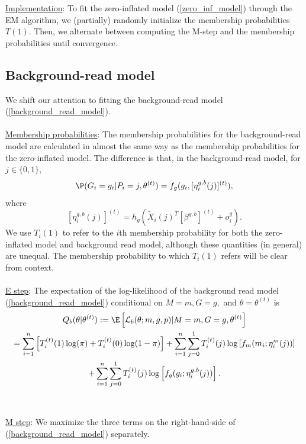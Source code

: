 \documentclass[12pt]{article}
\begin{document}
\underline{Implementation}: To fit the zero-inflated model (\ref{zero_inf_model}) through the EM algorithm, we (partially) randomly initialize the membership probabilities $T(1)$. Then, we alternate between computing the M-step and the membership probabilities until convergence.

\subsection{Background-read model}

We shift our attention to fitting the background-read model (\ref{background_read_model}).
\\ \\ \noindent
\underline{Membership probabilities}: The membership probabilities for the background-read model are calculated in almost the same way as the membership probabilities for the zero-inflated model. The difference is that, in the background-read model, for $j \in \{0,1\}$,
$$ \P( G_i = g_i | P_i =j, \theta^{(t)}) = f_g(g_i, [\eta_i^{g,b}(j) ]^{(t)}),$$ where $$ [\eta^{g,b}_i(j)]^{(t)} = h_g( \tilde{X}_i(j)^T [ \beta^{g,b}]^{(t)} + o^g_i).$$ We use $T_i(1)$ to refer to the $i$th membership probability for both the zero-inflated model and background read model, although these quantities (in general) are unequal. The membership probability to which $T_i(1)$ refers will be clear from context.
\\ \\ \noindent
\underline{E step}: The expectation of the log-likelihood of the background read model (\ref{background_read_model}) conditional on $M = m, G = g,$ and $\theta = \theta^{(t)}$ is 
\begin{multline}\label{exp_log_lik_background_read}
Q_b(\theta |\theta^{(t)}) :=  \E \left[ \mathcal{L}_b(\theta; m, g, p) | M = m, G = g, \theta^{(t)} \right] \\ = \sum_{i=1}^n \left[ T^{(t)}_i(1)\log(\pi) + T_i^{(t)}(0) \log(1 - \pi)\right] + \sum_{i=1}^n \sum_{j=0}^1 T^{(t)}_i(j) \log \left[ f_m( m_i; \eta_i^m(j)) \right] \\ + \sum_{i=1}^n \sum_{j=0}^1 T^{(t)}_i(j) \log \left[ f_g( g_i; \eta^{g,b}_i(j)) \right].
\end{multline}
\\ \\ \noindent
\underline{M step}: We maximize the three terms on the right-hand-side of (\ref{background_read_model}) separately.
\end{document}
